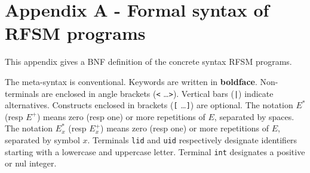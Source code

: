 \chapter*{Appendix A - Formal syntax of RFSM programs}
\label{cha:bnf}

This appendix gives a BNF definition of the concrete syntax RFSM programs.

\medskip
The meta-syntax is conventional. Keywords are written in \textbf{boldface}.  Non-terminals are
enclosed in angle brackets ({\tt <} \ldots {\tt >}).  Vertical bars ({\tt |}) indicate
alternatives.  Constructs enclosed in brackets ({\tt [} \ldots {\tt ]}) are optional.
The notation $E^*$ (resp $E^+$) means zero (resp one) or more repetitions of $E$, separated by spaces.
The notation $E^*_x$ (resp $E^+_x$) means zero (resp one) or more repetitions of $E$, separated by
symbol $x$. Terminals \verb|lid| and \verb|uid| respectively designate identifiers
starting with a lowercase and uppercase letter. Terminal \verb|int| designates a positive or nul
integer.




